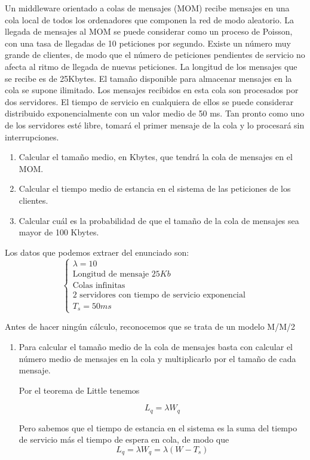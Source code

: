 \begin{problem}[11]
Un middleware orientado a colas de mensajes (MOM) recibe mensajes en una cola local de todos los ordenadores que componen la red de modo aleatorio. La llegada de mensajes al MOM se puede considerar como un proceso de Poisson, con una tasa de llegadas de 10 peticiones por segundo. Existe un número muy grande de clientes, de modo que el número de peticiones pendientes de servicio no afecta al ritmo de llegada de nuevas peticiones. La longitud de los mensajes que se recibe es de 25Kbytes. El tamaño disponible para almacenar mensajes en la cola se supone ilimitado. Los mensajes recibidos en esta cola son procesados por dos servidores. El tiempo de servicio en cualquiera de ellos se puede considerar distribuido exponencialmente con un valor medio de 50 ms. Tan pronto como uno de los servidores esté libre, tomará el primer mensaje de la cola y lo procesará sin interrupciones.
\begin{enumerate}
\item Calcular el tamaño medio, en Kbytes, que tendrá la cola de mensajes en el MOM.
\item Calcular el tiempo medio de estancia en el sistema de las peticiones de los clientes.
\item Calcular cuál es la probabilidad de que el tamaño de la cola de mensajes sea mayor de 100 Kbytes.
\end{enumerate}


\solution

Los datos que podemos extraer del enunciado son:
\[\left\{
\begin{array}{l}
λ = 10 \\
\text{Longitud de mensaje } 25Kb \\
\text{Colas infinitas} \\
\text{2 servidores con tiempo de servicio exponencial} \\
T_s = 50ms
\end{array}
\right.\]

Antes de hacer ningún cálculo, reconocemos que se trata de un modelo M/M/2
\begin{enumerate}
\item
Para calcular el tamaño medio de la cola de mensajes basta con calcular el número medio de mensajes en la cola y multiplicarlo por el tamaño de cada mensaje.

Por el teorema de Little tenemos

\[L_q = λ W_q\]

Pero sabemos que el tiempo de estancia en el sistema es la suma del tiempo de servicio más el tiempo de espera en cola, de modo que
\[L_q = λ W_q = λ (W-T_s)\]


\end{enumerate}
\end{problem}
